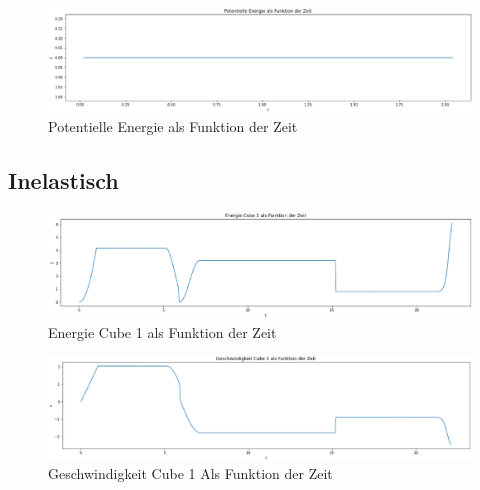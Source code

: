 \documentclass[../main.tex]{subfiles}
\begin{document}
    \begin{figure}[H]
        \begin{center}
            \centerline{\includegraphics[width=155mm]{./images/Elastisch/PotentielleEnergieAlsFunktionDerZeit}}
            \caption{Potentielle Energie als Funktion der Zeit}
            \label{fig:PotentielleEnergieAlsFunktionDerZeit}
        \end{center}
    \end{figure}

    \subsection{Inelastisch}

    \begin{figure}[H]
        \begin{center}
            \centerline{\includegraphics[width=155mm]{./images/Inelastisch/EnergieCube1AlsFunktionDerZeit}}
            \caption{Energie Cube 1 als Funktion der Zeit}
            \label{fig:EnergieCube1AlsFunktionDerZeit}
        \end{center}
    \end{figure}

    \begin{figure}[H]
        \begin{center}
            \centerline{\includegraphics[width=155mm]{./images/Inelastisch/GeschwindigkeitCube1AlFunktionDerZeit}}
            \caption{Geschwindigkeit Cube 1 Als Funktion der Zeit}
            \label{fig:GeschwindigkeitCube1AlFunktionDerZeit}
        \end{center}
    \end{figure}
\end{document}
